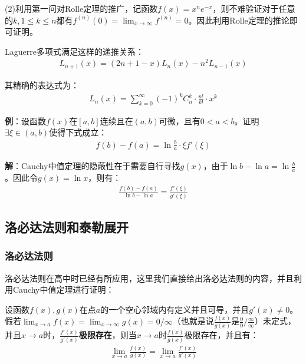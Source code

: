 \documentclass{ctexart}
\let\oldtextbf\textbf %
\renewcommand{\textbf}[1]{\textcolor{btex}{\oldtextbf{#1}}} %
\begin{document}
(2)利用第一问对Rolle定理的推广，记函数$f(x)=x^ne^{-x}$，则不难验证对于任意的$k,1\leq k\leq n$都有$f^{(n)}(0)=\lim_{x\to\infty}f^{(n)}=0$。因此利用Rolle定理的推论即可证明。

\begin{tcolorbox}[
    colback=bac2,     %
    colframe=fra2,   %
    coltitle=white,             %
    coltext=tex2,
    title=小拓展——关于Laguerre多项式,
    fonttitle=\bfseries,        %
arc=3mm,                     %
breakable
]
Laguerre多项式满足这样的递推关系：
\begin{align*}
    L_{n+1}(x)=(2n+1-x)L_n(x)-n^2L_{n-1}(x)
\end{align*}

其精确的表达式为：
\begin{align*}
    L_n(x)=\sum_{k=0}^\infty (-1)^kC_n^k\cdot\frac{n!}{k!}\cdot x^k
\end{align*}
\end{tcolorbox}

\textbf{例}：设函数$f(x)$在$[a,b]$连续且在$(a,b)$可微，且有$0<a<b$。证明$\exists \xi\in(a,b)$使得下式成立：
\begin{align*}
    f(b)-f(a)=\ln\frac{b}{a}\cdot \xi f'(\xi)
\end{align*}

\textbf{解}：Cauchy中值定理的隐蔽性在于需要自行寻找$g(x)$，由于$\ln b-\ln a=\ln\frac{b}{a}$。因此令$g(x)=\ln x$，则有：
\begin{align*}
    \frac{f(b)-f(a)}{\ln b-\ln a}=\frac{f'(\xi)}{g'(\xi)}
\end{align*}

\subsection{洛必达法则和泰勒展开}
\subsubsection{洛必达法则}
洛必达法则在高中时已经有所应用，这里我们直接给出洛必达法则的内容，并且利用Cauchy中值定理进行证明：
\begin{tcolorbox}[
    colback=bac1,     %
    colframe=fra1,   %
    coltitle=white,             %
    coltext=tex1,
    title=L'Hospital洛必达法则,
    fonttitle=\bfseries,        %
arc=3mm,                     %
breakable
]
设函数$f(x),g(x)$在点$a$的一个空心邻域内有定义并且可导，并且$g'(x)\neq 0$。假若$\lim_{x\to a}f(x)=\lim_{x\to \infty}g(x)=0/\infty$（也就是说$\frac{f(x)}{g(x)}$是$\frac{0}{0}/\frac{\infty}{\infty}$）未定式，并且$x\to a$时，\textbf{$\frac{f'(x)}{g'(x)}$极限存在}，则当$x\to a$时$\frac{f(x)}{g(x)}$极限存在，并且有：
\begin{align*}
    \lim_{x\to a}\frac{f(x)}{g(x)}=\lim_{x\to a}\frac{f'(x)}{g'(x)}\tag{3-4}
\end{align*}
\end{tcolorbox}
\end{document}
